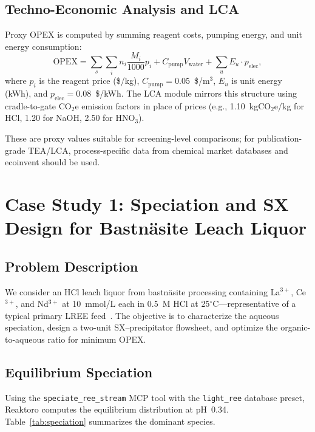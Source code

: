 \documentclass[11pt]{article}
\begin{document}
\subsection{Techno-Economic Analysis and LCA}

Proxy OPEX is computed by summing reagent costs, pumping energy, and
unit energy consumption:
\begin{equation}
  \text{OPEX} = \sum_{s} \sum_i n_i \frac{M_i}{1000} p_i
    + C_{\text{pump}} V_{\text{water}}
    + \sum_u E_u \cdot p_{\text{elec}},
\end{equation}
where $p_i$ is the reagent price (\$/kg), $C_{\text{pump}} = 0.05$~\$/m$^3$,
$E_u$ is unit energy (kWh), and $p_{\text{elec}} = 0.08$~\$/kWh.
The LCA module mirrors this structure using cradle-to-gate CO$_2$e
emission factors in place of prices (e.g., 1.10~kgCO$_2$e/kg for HCl,
1.20 for NaOH, 2.50 for HNO$_3$).

These are proxy values suitable for screening-level comparisons; for
publication-grade TEA/LCA, process-specific data from chemical market
databases and ecoinvent should be used.


\section{Case Study 1: Speciation and SX Design for Bastn\"asite Leach Liquor}\label{sec:case1}

\subsection{Problem Description}

We consider an HCl leach liquor from bastn\"asite processing containing
La$^{3+}$, Ce$^{3+}$, and Nd$^{3+}$ at 10~mmol/L each in 0.5~M HCl
at 25$^\circ$C---representative of a typical primary LREE
feed~\citep{xie2014critical}.  The objective is to characterize the
aqueous speciation, design a two-unit SX--precipitator flowsheet, and
optimize the organic-to-aqueous ratio for minimum OPEX.

\subsection{Equilibrium Speciation}

Using the \texttt{speciate\_ree\_stream} MCP tool with the
\texttt{light\_ree} database preset, Reaktoro computes the equilibrium
distribution at pH~0.34.  Table~\ref{tab:speciation} summarizes the
dominant species.
\end{document}
